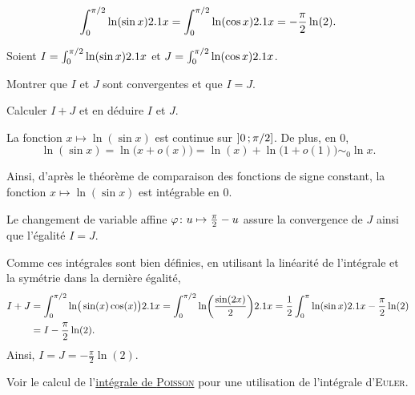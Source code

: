 \begin{marginfigure}[0cm]
    
\end{marginfigure}


\begin{prop}
\[
\int_0^{\pi/2} \ln(\sin x) \d x
= \int_0^{\pi/2} \ln(\cos x) \d x
= -\frac{\pi}{2} \ln(2).
\]
\end{prop}

\begin{exercice}\label{exercice:integraleEuler}
    Soient $I = \int_0^{\pi/2} \ln(\sin x) \d x$ et $J = \int_0^{\pi/2} \ln(\cos x) \d x$.
    \begin{questions}
        \item Montrer que $I$ et $J$ sont convergentes et que $I = J$.
        \item Calculer $I + J$ et en déduire $I$ et $J$.
    \end{questions}
\end{exercice}


\begin{elemsolution}
\begin{reponses}
\item La fonction $x \mapsto \ln(\sin x)$ est continue sur $\interof{0}{\pi/2}$. De plus, en $0$,
\[
\ln(\sin x) = \ln\mathopen{}\big(x + o(x)\big) = \ln(x) + \ln\mathopen{}\big(1 + o(1)\big) \sim_0 \ln x.
\]

Ainsi, d'après le théorème de comparaison des fonctions de signe constant, la fonction $x \mapsto \ln(\sin x)$ est intégrable en $0$.

Le changement de variable affine $\fonctionligne[\varphi]{u}{\frac{\pi}{2} - u}$ assure la convergence de $J$ ainsi que l'égalité $I = J$.

\item Comme ces intégrales sont bien définies, en utilisant la linéarité de l'intégrale et la symétrie dans la dernière égalité,
\begin{align*}
I + J &= \int_0^{\pi/2} \ln\mathopen{}\big( \sin(x) \cos(x) \big) \d x = \int_0^{\pi/2} \ln(\frac{\sin(2x)}{2}) \d x = \frac{1}{2} \int_0^\pi \ln(\sin x) \d x - \frac{\pi}{2} \ln(2) \\
&= I - \frac{\pi}{2} \ln(2).
\end{align*}
Ainsi, $I = J = -\frac{\pi}{2} \ln(2)$.
\end{reponses}
\end{elemsolution}
Voir le calcul de l'\hyperref[exercice:integralePoisson]{intégrale de \textsc{Poisson}} pour une utilisation de l'intégrale d'\textsc{Euler}.

